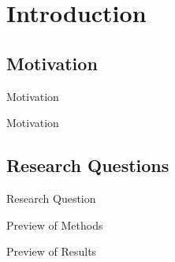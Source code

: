 \documentclass[10pt]{beamer}
\title[ ] %
{}
\author[ ] %
{Kangli Li \inst{1}}
\institute[]{\inst{1} University of Wisconsin-Madison}
\date[ ] %
{Presentation name}
\begin{document}
	
\begin{frame}
	\titlepage
\end{frame}


\section{Introduction}

\subsection{Motivation}

\begin{frame}{Motivation}
\linespread{1.5}

\end{frame}


\begin{frame}{Motivation}
\linespread{1.5}

\end{frame}



\subsection{Research Questions}
\begin{frame}{Research Question}

\end{frame}



\begin{frame}{Preview of Methods}
\linespread{1.5}

\end{frame}


\begin{frame}{Preview of Results}
\linespread{1.5}

\end{frame}
\end{document}
